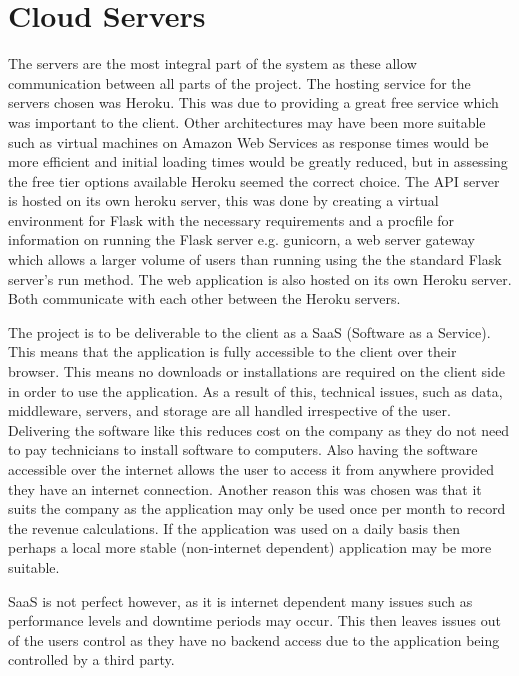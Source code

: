 \section{Cloud Servers}
The servers are the most integral part of the system as these allow communication between all parts of the project. The hosting service for the servers chosen was Heroku. This was due to providing a great free service which was important to the client. Other architectures may have been more suitable such as virtual machines on Amazon Web Services as response times would be more efficient and initial loading times would be greatly reduced, but in assessing the free tier options available Heroku seemed the correct choice. The API server is hosted on its own heroku server, this was done by creating a virtual environment for Flask with the necessary requirements and a procfile for information on running the Flask server e.g. gunicorn, a web server gateway which allows a larger volume of users than running using the the standard Flask server’s run method. The web application is also hosted on its own Heroku server. Both communicate with each other between the Heroku servers.\par
The project is to be deliverable to the client as a SaaS (Software as a Service). This means that the application is fully accessible to the client over their browser. This means no downloads or installations are required on the client side in order to use the application. As a result of this, technical issues, such as data, middleware, servers, and storage are all handled irrespective of the user. Delivering the software like this reduces cost on the company as they do not need to pay technicians to install software to computers. Also having the software accessible over the internet allows the user to access it from anywhere provided they have an internet connection. Another reason this was chosen was that it suits the company as the application may only be used once per month to record the revenue calculations. If the application was used on a daily basis then perhaps a local more stable (non-internet dependent) application may be more suitable.\par
SaaS is not perfect however, as it is internet dependent many issues such as performance levels and downtime periods may occur. This then leaves issues out of the users control as they have no backend access due to the application being controlled by a third party.

